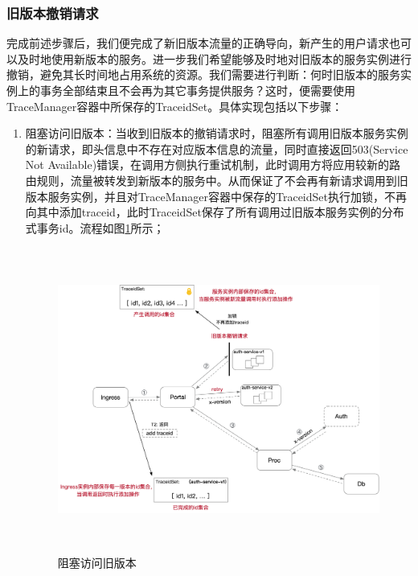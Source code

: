 \documentclass[12pt,a4paper]{article}
\theoremstyle{definition}
\begin{document}
\subsubsection{旧版本撤销请求}
完成前述步骤后，我们便完成了新旧版本流量的正确导向，新产生的用户请求也可以及时地使用新版本的服务。进一步我们希望能够及时地对旧版本的服务实例进行撤销，避免其长时间地占用系统的资源。我们需要进行判断：何时旧版本的服务实例上的事务全部结束且不会再为其它事务提供服务？这时，便需要使用TraceManager容器中所保存的TraceidSet。具体实现包括以下步骤：
\begin{enumerate}
	\item 阻塞访问旧版本：当收到旧版本的撤销请求时，阻塞所有调用旧版本服务实例的新请求，即头信息中不存在对应版本信息的流量，同时直接返回503(Service Not Available)错误，在调用方侧执行重试机制，此时调用方将应用较新的路由规则，流量被转发到新版本的服务中。从而保证了不会再有新请求调用到旧版本服务实例，并且对TraceManager容器中保存的TraceidSet执行加锁，不再向其中添加traceid，此时TraceidSet保存了所有调用过旧版本服务实例的分布式事务id。流程如图\ref{fig:block_and_retry}所示；
	\begin{figure}[ht]
	 \centering
	 \includegraphics[height=10cm]{images/block_and_retry.png}
	 \caption{阻塞访问旧版本}
	 \label{fig:block_and_retry}
	\end{figure}


\end{enumerate}
\end{document}

